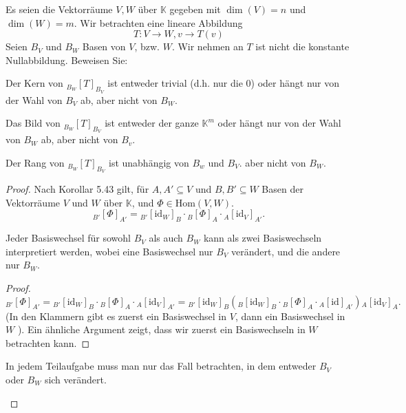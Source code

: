 \begin{Problem}
	Es seien die Vektorräume $V, W$ über $\mathbb{K}$ gegeben mit $\dim(V) = n$ und $\dim(W ) = m$. Wir betrachten eine lineare Abbildung
	\[
	T:V\to W, v\to T(v)\] 
Seien $B_V$ und $B_W$ Basen von $V$, bzw. $W$. Wir nehmen an $T$ ist nicht die konstante Nullabbildung. Beweisen Sie:
\begin{parts}
\item Der Kern von $_{B_W}[T]_{B_V}$ ist entweder trivial (d.h. nur die 0) oder hängt nur von der Wahl von $B_V$ ab, aber nicht von $B_W$.
\item Das Bild von $_{B_W}[T]_{B_V}$ ist entweder der ganze $\mathbb{K}^m$ oder hängt nur von der Wahl von $B_W$ ab, aber nicht von $B_v$. 
\item Der Rang von $_{B_W}[T]_{B_V}$ ist unabh\"{a}ngig von $B_w$ und $B_V$.
aber nicht von $B_W$.
\end{parts}
\end{Problem}
\begin{proof}
Nach Korollar 5.43 gilt, f\"{u}r $A,A' \subseteq V$ und $B,B'\subseteq W$ Basen der Vektorräume $V$ und $W$ über $\mathbb{K}$, und $\Phi\in \text{Hom}(V,W)$.
 \[
	 _{B'}\left[ \Phi \right]_{A'}={}_{B'}[\text{id}_W]_B\cdot{}_B[\Phi]_A\cdot{}_A[\text{id}_V]_{A'}
.\] 
\begin{Lemma}
	Jeder Basiswechsel f\"{u}r sowohl $B_V$ als auch $B_W$ kann als zwei Basiswechseln interpretiert werden, wobei eine Basiswechsel nur $B_V$ verändert, und die andere nur $B_W$.
\end{Lemma}
\begin{proof}
	\[
		_{B'}\left[ \Phi \right]_{A'}={}_{B'}[\text{id}_W]_B\cdot{}_B[\Phi]_A\cdot{}_A[\text{id}_V]_{A'}={}_{B'}[\text{id}_W]_B\left( {}_B[\text{id}_W]_B\cdot {}_B[\Phi]_A\cdot {}_A[\text{id}]_{A'} \right) {}_A[\text{id}_V]_A
	.\]
	(In den Klammern gibt es zuerst ein Basiswechsel in $V$, dann ein Basiswechsel in $W$ ). Ein ähnliche Argument zeigt, dass wir zuerst ein Basiswechseln in $W$ betrachten kann.
\end{proof}
\begin{Corollary}
	In jedem Teilaufgabe muss man nur das Fall betrachten, in dem entweder $B_V$ oder $B_W$ sich verändert. 
\end{Corollary}
	\begin{parts}
	\item 
	\end{parts}
\end{proof}
